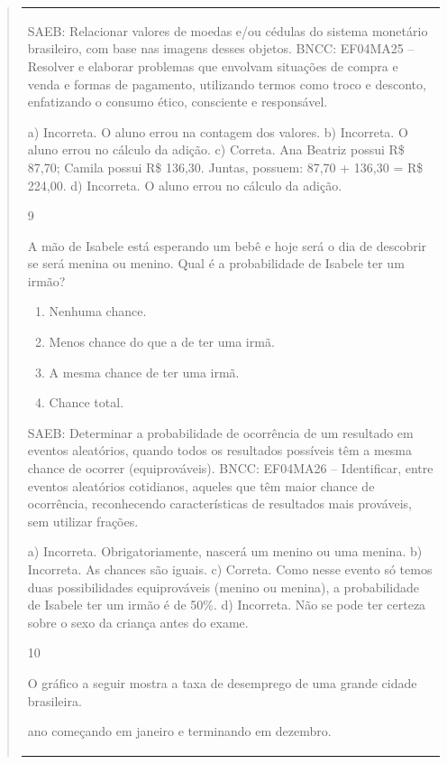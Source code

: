 \begin{mdframed}[linewidth=2pt,linecolor=salmao,roundcorner=2pt]
\begin{itemize}
{\begin{itemize}
\begin{escolha}
{\begin{quote}
{\begin{escolha}
{{{{{\begin{longtable}[]{@{}l@{}}
\begin{itemize}
{SAEB: Relacionar valores de moedas e/ou cédulas do sistema
monetário brasileiro, com base nas imagens desses objetos.
BNCC: EF04MA25 -- Resolver e elaborar problemas que envolvam situações de compra e venda e formas
de pagamento, utilizando termos como troco e desconto, enfatizando o consumo ético, consciente e
responsável.

a) Incorreta. O aluno errou na contagem dos valores.
b) Incorreta. O aluno errou no cálculo da adição.
c) Correta. Ana Beatriz possui R\$ 87,70; Camila possui R\$ 136,30. Juntas, possuem: 87,70 + 136,30 = R\$ 224,00.
d) Incorreta. O aluno errou no cálculo da adição.

\num{9}

A mão de Isabele está esperando um bebê e hoje será o dia de descobrir
se será menina ou menino. Qual é a probabilidade de Isabele ter um irmão?

\begin{enumerate}
\item
  Nenhuma chance.
\item
  Menos chance do que a de ter uma irmã.
\item
  A mesma chance de ter uma irmã.
\item
  Chance total.
\end{enumerate}

SAEB: Determinar a probabilidade de ocorrência de um
resultado em eventos aleatórios, quando todos os resultados possíveis
têm a mesma chance de ocorrer (equiprováveis).
BNCC: EF04MA26 -- Identificar, entre eventos aleatórios cotidianos, aqueles que têm maior chance de
ocorrência, reconhecendo características de resultados mais prováveis, sem utilizar frações.

a) Incorreta. Obrigatoriamente, nascerá um menino ou uma menina.
b) Incorreta. As chances são iguais.
c) Correta. Como nesse evento só temos duas possibilidades equiprováveis (menino ou
menina), a probabilidade de Isabele ter um irmão é de 50\%.
d) Incorreta. Não se pode ter certeza sobre o sexo da criança antes do exame.

\num{10}

O gráfico a seguir mostra a taxa de desemprego de uma grande cidade
brasileira.


ano começando em janeiro e terminando em dezembro.

}
\end{itemize}
\end{longtable}}}}}}
\end{escolha}}
\end{quote}}
\end{escolha}
\end{itemize}}
\end{itemize}
\end{mdframed}
